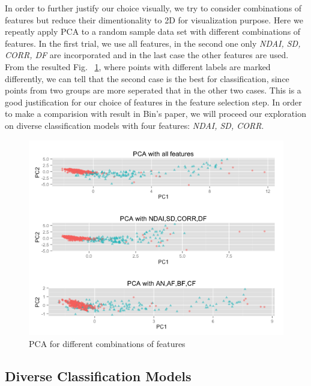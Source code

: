 \documentclass[english]{article}\usepackage{graphicx, color}
\numberwithin{equation}{section}
\numberwithin{figure}{section}
\begin{document}
In order to further justify our choice visually, we try to consider combinations
of features but reduce their dimentionality to 2D for visualization purpose. 
Here we repeatly apply PCA to a random sample data set with different 
combinations of features. In the first trial, we use all features, in the second 
one only \textit{NDAI, SD, CORR, DF} are incorporated and in the last case 
the other features are used. From the resulted Fig. ~\ref{fig:PCA}, where 
points with different labels are marked differently, we can tell that the second 
case is the best for classification, since points from two groups are more 
seperated that in the other two cases. This is a good justification for our 
choice of features in the feature selection step. In order to make a comparision 
with result in Bin's paper,  we will proceed our exploration on diverse 
classification models with four features: \textit{NDAI, SD, CORR}.

\begin{figure}[!h]
  \begin{center}
    \includegraphics[width=\columnwidth]{../figures/PCA_selection.png}
  \end{center}
  \caption{PCA for different combinations of features}
  \label{fig:PCA}
\end{figure}


\subsection{Diverse Classification Models}
\end{document}

